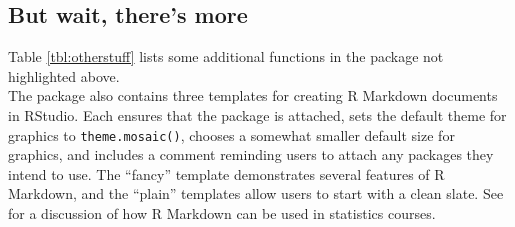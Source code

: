 \subsection{But wait, there's more}\label{but-wait-theres-more}

Table \ref{tbl:otherstuff} lists some additional functions in the
 package not highlighted above.\\
The package also contains three templates for creating R Markdown
documents in RStudio. Each ensures that the  package is
attached, sets the default theme for  graphics to
\texttt{theme.mosaic()}, chooses a somewhat smaller default size for
graphics, and includes a comment reminding users to attach any packages
they intend to use. The ``fancy'' template demonstrates several features
of R Markdown, and the ``plain'' templates allow users to start with a
clean slate. See \cite{Baumer:RMarkdown:2014} for a discussion of how R
Markdown can be used in statistics courses.

